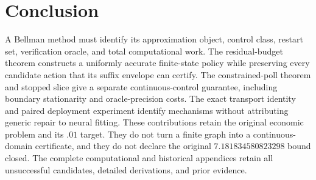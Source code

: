 \section{Conclusion}
A Bellman method must identify its approximation object, control class, restart set, verification oracle, and total computational work. The residual-budget theorem constructs a uniformly accurate finite-state policy while preserving every candidate action that its suffix envelope can certify. The constrained-poll theorem and stopped slice give a separate continuous-control guarantee, including boundary stationarity and oracle-precision costs. The exact transport identity and paired deployment experiment identify mechanisms without attributing generic repair to neural fitting. These contributions retain the original economic problem and its $.01$ target. They do not turn a finite graph into a continuous-domain certificate, and they do not declare the original $7.181834580823298$ bound closed. The complete computational and historical appendices retain all unsuccessful candidates, detailed derivations, and prior evidence.
\begin{appendix}

\end{appendix}
\clearpage


